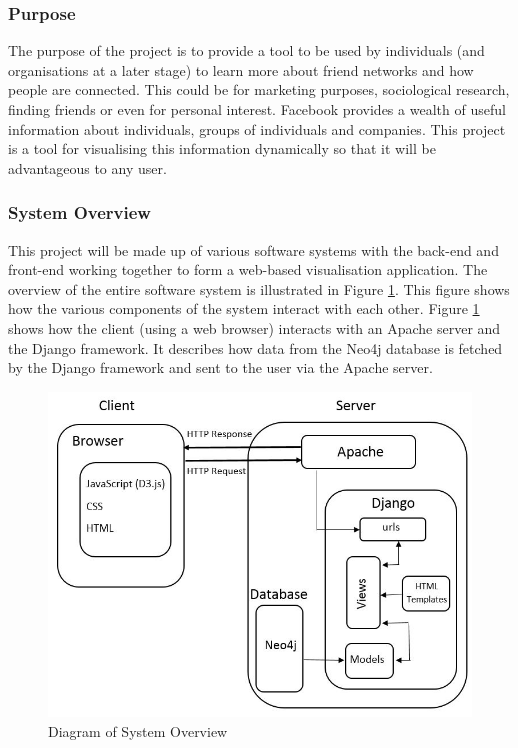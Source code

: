 \documentclass[12pt,onecolumn]{article}
\begin{document}
	\subsubsection{Purpose}
	The purpose of the project is to provide a tool to be used by individuals (and organisations at a later stage) to learn more about friend networks and how people are connected. This could be for marketing purposes, sociological research, finding friends or even for personal  interest. Facebook provides a wealth of useful information about individuals, groups of individuals and companies. This project is a tool for visualising this information dynamically so that it will be advantageous to any  user.
	
	\subsubsection{System Overview}
	This project will be made up of various software systems with the back-end and front-end working together to form a web-based visualisation application. The overview of the entire software system is illustrated in Figure \ref{system}. This figure shows how the various components of the system interact with each other. Figure \ref{system} shows how the client (using a web browser) interacts with an Apache server and the Django framework. It describes how data from the Neo4j database is fetched by the Django framework and sent to the user via the Apache server.
	
	\begin{figure}[h]
		\centering
		\includegraphics[width=\textwidth]{system}
		\caption{Diagram of System Overview}
		\label{system}
	\end{figure}
	
\end{document}
